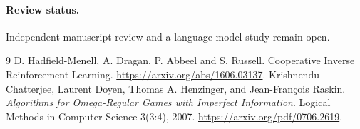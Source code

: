 \documentclass[11pt]{article}
\begin{document}
\paragraph{Review status.} Independent manuscript review and a language-model study remain open.

\begin{thebibliography}{9}
 D. Hadfield-Menell, A. Dragan, P. Abbeel and S. Russell.
Cooperative Inverse Reinforcement Learning.
\url{https://arxiv.org/abs/1606.03137}.
 Krishnendu Chatterjee, Laurent Doyen,
Thomas A. Henzinger, and Jean-Fran\c{c}ois Raskin.
\emph{Algorithms for Omega-Regular Games with Imperfect Information}.
Logical Methods in Computer Science 3(3:4), 2007.
\url{https://arxiv.org/pdf/0706.2619}.
\end{thebibliography}
\end{document}

